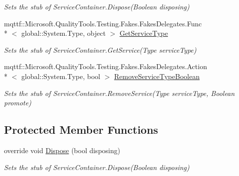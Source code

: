 \begin{DoxyCompactItemize}
\begin{DoxyCompactList}\small\item\em Sets the stub of Service\-Container.\-Dispose(\-Boolean disposing)\end{DoxyCompactList}\item 
mqttf\-::\-Microsoft.\-Quality\-Tools.\-Testing.\-Fakes.\-Fakes\-Delegates.\-Func\\*
$<$ global\-::\-System.\-Type, object $>$ \hyperlink{class_system_1_1_component_model_1_1_design_1_1_fakes_1_1_stub_service_container_a5cace927b8988d630c75710cd5e486ec}{Get\-Service\-Type}
\begin{DoxyCompactList}\small\item\em Sets the stub of Service\-Container.\-Get\-Service(\-Type service\-Type)\end{DoxyCompactList}\item 
mqttf\-::\-Microsoft.\-Quality\-Tools.\-Testing.\-Fakes.\-Fakes\-Delegates.\-Action\\*
$<$ global\-::\-System.\-Type, bool $>$ \hyperlink{class_system_1_1_component_model_1_1_design_1_1_fakes_1_1_stub_service_container_ac5328075c0a35de89f0493518d899b9d}{Remove\-Service\-Type\-Boolean}
\begin{DoxyCompactList}\small\item\em Sets the stub of Service\-Container.\-Remove\-Service(\-Type service\-Type, Boolean promote)\end{DoxyCompactList}\end{DoxyCompactItemize}
\subsection*{Protected Member Functions}
\begin{DoxyCompactItemize}
\item 
override void \hyperlink{class_system_1_1_component_model_1_1_design_1_1_fakes_1_1_stub_service_container_a40387f88c57ec6031ad30f9f0417671e}{Dispose} (bool disposing)
\begin{DoxyCompactList}\small\item\em Sets the stub of Service\-Container.\-Dispose(\-Boolean disposing)\end{DoxyCompactList}\end{DoxyCompactItemize}
